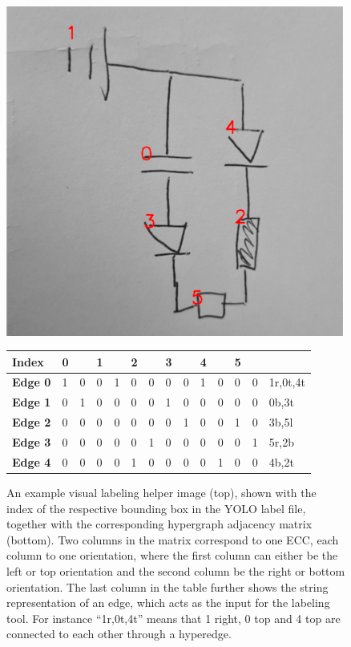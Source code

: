 \begin{figure}
\begin{center}

    \includegraphics[width=11.1cm]{imgs/topology_label_idx_example.png}
    \vspace{2cm}

    \begin{tabular}{|l||l|l|l|l|l|l|l|l|l|l|l|l||l|}

    \hline
	\textbf{Index}  & 0 &   & 1 &   & 2 &   & 3 &   & 4 &   & 5 &   & \\
    \hline\hline
	\textbf{Edge 0} & 1 & 0 & 0 & 1 & 0 & 0 & 0 & 0 & 1 & 0 & 0 & 0 & 1r,0t,4t \\
    \hline
    \textbf{Edge 1} & 0 & 1 & 0 & 0 & 0 & 0 & 1 & 0 & 0 & 0 & 0 & 0 & 0b,3t    \\
    \hline
    \textbf{Edge 2} & 0 & 0 & 0 & 0 & 0 & 0 & 0 & 1 & 0 & 0 & 1 & 0 & 3b,5l    \\
    \hline
    \textbf{Edge 3} & 0 & 0 & 0 & 0 & 0 & 1 & 0 & 0 & 0 & 0 & 0 & 1 & 5r,2b    \\
    \hline
    \textbf{Edge 4} & 0 & 0 & 0 & 0 & 1 & 0 & 0 & 0 & 0 & 1 & 0 & 0 & 4b,2t    \\
    \hline

    \end{tabular}

    \caption{An example visual labeling helper image (top), shown with the index of the respective bounding box in the YOLO label file, together with the corresponding hypergraph adjacency matrix (bottom). Two columns in the matrix correspond to one \ac{ECC}, each column to one orientation, where the first column can either be the left or top orientation and the second column be the right or bottom orientation. The last column in the table further shows the string representation of an edge, which acts as the input for the labeling tool. For instance ``1r,0t,4t'' means that 1 right, 0 top and 4 top are connected to each other through a hyperedge.}
    \label{fig:example_topology_label}

\end{center}
\end{figure}

